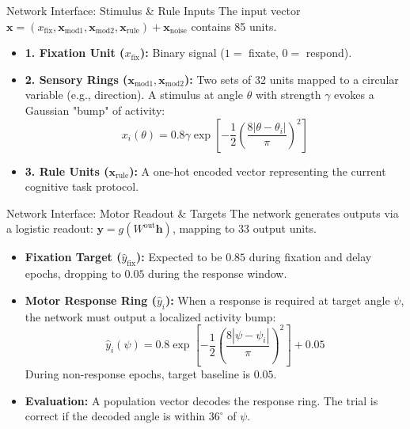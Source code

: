 \documentclass[aspectratio=169,xcolor=dvipsnames]{beamer}
\begin{document}

\begin{frame}{Network Interface: Stimulus \& Rule Inputs}
	\footnotesize
	The input vector $\mathbf{x} = (x_{\text{fix}}, \mathbf{x}_{\text{mod1}}, \mathbf{x}_{\text{mod2}}, \mathbf{x}_{\text{rule}}) + \mathbf{x}_{\text{noise}}$ contains 85 units.
	
	\begin{itemize}
		\item \textbf{1. Fixation Unit ($x_{\text{fix}}$):} 
		Binary signal ($1=$ fixate, $0=$ respond).
		
		\item \textbf{2. Sensory Rings ($\mathbf{x}_{\text{mod1}}, \mathbf{x}_{\text{mod2}}$):} 
		Two sets of 32 units mapped to a circular variable (e.g., direction). A stimulus at angle $\theta$ with strength $\gamma$ evokes a Gaussian "bump" of activity:
		$$x_i(\theta) = 0.8 \gamma \exp \left[ -\frac{1}{2} \left( \frac{8|\theta - \theta_i|}{\pi} \right)^2 \right]$$
		
		\item \textbf{3. Rule Units ($\mathbf{x}_{\text{rule}}$):} 
		A one-hot encoded vector representing the current cognitive task protocol.
	\end{itemize}
\end{frame}


\begin{frame}{Network Interface: Motor Readout \& Targets}
	\footnotesize
	The network generates outputs via a logistic readout: $\mathbf{y} = g(W^{\text{out}}\mathbf{h})$, mapping to 33 output units.
	
	\begin{itemize}
		\item \textbf{Fixation Target ($\hat{y}_{\text{fix}}$):} 
		Expected to be $0.85$ during fixation and delay epochs, dropping to $0.05$ during the response window.
		
		\item \textbf{Motor Response Ring ($\hat{y}_i$):} 
		When a response is required at target angle $\psi$, the network must output a localized activity bump:
		$$\hat{y}_i(\psi) = 0.8 \exp \left[ -\frac{1}{2} \left( \frac{8|\psi - \psi_i|}{\pi} \right)^2 \right] + 0.05$$
		During non-response epochs, target baseline is $0.05$.
		
		\item \textbf{Evaluation:} 
		A population vector decodes the response ring. The trial is correct if the decoded angle is within $36^\circ$ of $\psi$.
	\end{itemize}
\end{frame}
\end{document}
